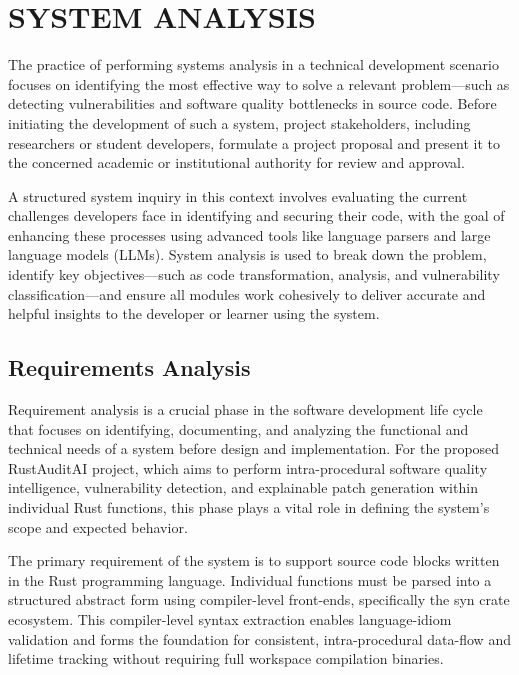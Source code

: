 \chapter{SYSTEM ANALYSIS}

\par
\hspace{0.5cm}
The practice of performing systems analysis in a technical development scenario focuses on identifying the most effective way to solve a relevant problem—such as detecting vulnerabilities and software quality bottlenecks in source code. Before initiating the development of such a system, project stakeholders, including researchers or student developers, formulate a project proposal and present it to the concerned academic or institutional authority for review and approval.

\par A structured system inquiry in this context involves evaluating the current challenges developers face in identifying and securing their code, with the goal of enhancing these processes using advanced tools like language parsers and large language models (LLMs). System analysis is used to break down the problem, identify key objectives—such as code transformation, analysis, and vulnerability classification—and ensure all modules work cohesively to deliver accurate and helpful insights to the developer or learner using the system.

\section{Requirements Analysis}
\hspace{0.5cm}
Requirement analysis is a crucial phase in the software development life cycle that focuses on identifying, documenting, and analyzing the functional and technical needs of a system before design and implementation. For the proposed RustAuditAI project, which aims to perform intra-procedural software quality intelligence, vulnerability detection, and explainable patch generation within individual Rust functions, this phase plays a vital role in defining the system's scope and expected behavior.

The primary requirement of the system is to support source code blocks written in the Rust programming language. Individual functions must be parsed into a structured abstract form using compiler-level front-ends, specifically the syn crate ecosystem. This compiler-level syntax extraction enables language-idiom validation and forms the foundation for consistent, intra-procedural data-flow and lifetime tracking without requiring full workspace compilation binaries.

